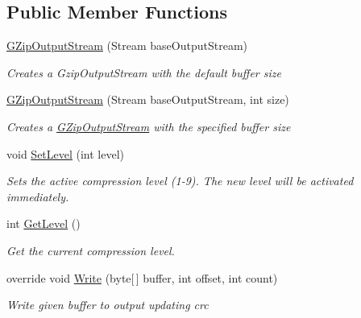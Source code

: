 \subsection*{Public Member Functions}
\begin{DoxyCompactItemize}
\item 
\hyperlink{class_i_c_sharp_code_1_1_sharp_zip_lib_1_1_g_zip_1_1_g_zip_output_stream_a8de4b46c4dd775a076c373ab46faabd8}{G\+Zip\+Output\+Stream} (Stream base\+Output\+Stream)
\begin{DoxyCompactList}\small\item\em Creates a Gzip\+Output\+Stream with the default buffer size \end{DoxyCompactList}\item 
\hyperlink{class_i_c_sharp_code_1_1_sharp_zip_lib_1_1_g_zip_1_1_g_zip_output_stream_ab3537d9d8872a588a9cf62ae4530a5a6}{G\+Zip\+Output\+Stream} (Stream base\+Output\+Stream, int size)
\begin{DoxyCompactList}\small\item\em Creates a \hyperlink{class_i_c_sharp_code_1_1_sharp_zip_lib_1_1_g_zip_1_1_g_zip_output_stream}{G\+Zip\+Output\+Stream} with the specified buffer size \end{DoxyCompactList}\item 
void \hyperlink{class_i_c_sharp_code_1_1_sharp_zip_lib_1_1_g_zip_1_1_g_zip_output_stream_aef311ac63321adbb56a01b3411b087f2}{Set\+Level} (int level)
\begin{DoxyCompactList}\small\item\em Sets the active compression level (1-\/9). The new level will be activated immediately. \end{DoxyCompactList}\item 
int \hyperlink{class_i_c_sharp_code_1_1_sharp_zip_lib_1_1_g_zip_1_1_g_zip_output_stream_ac81ca0f33912969eeb665f869496b7ba}{Get\+Level} ()
\begin{DoxyCompactList}\small\item\em Get the current compression level. \end{DoxyCompactList}\item 
override void \hyperlink{class_i_c_sharp_code_1_1_sharp_zip_lib_1_1_g_zip_1_1_g_zip_output_stream_ae2563272a7d1c880a2e932985c7a79cd}{Write} (byte\mbox{[}$\,$\mbox{]} buffer, int offset, int count)
\begin{DoxyCompactList}\small\item\em Write given buffer to output updating crc \end{DoxyCompactList}\item 

\end{DoxyCompactItemize}

